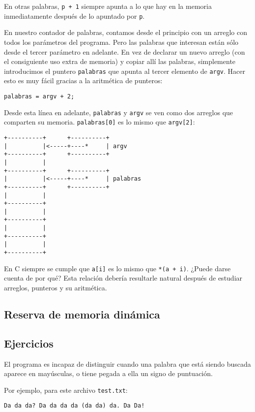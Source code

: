En otras palabras, \lstinline!p + 1! siempre apunta a lo que hay en la
memoria inmediatamente después de lo apuntado por \lstinline!p!.

En nuestro contador de palabras, contamos desde el principio con un
arreglo con todos los parámetros del programa. Pero las palabras que
interesan están sólo desde el tercer parámetro en adelante. En vez de
declarar un nuevo arreglo (con el consiguiente uso extra de memoria) y
copiar allí las palabras, simplemente introducimos el puntero
\lstinline!palabras! que apunta al tercer elemento de \lstinline!argv!.
Hacer esto es muy fácil gracias a la aritmética de punteros:

\begin{lstlisting}
palabras = argv + 2;
\end{lstlisting}

Desde esta línea en adelante, \lstinline!palabras! y \lstinline!argv! se
ven como dos arreglos que comparten su memoria. \lstinline!palabras[0]!
es lo mismo que \lstinline!argv[2]!:

\begin{lstlisting}
+----------+      +----------+
|          |<-----+----*     | argv
+----------+      +----------+
|          |
+----------+      +----------+
|          |<-----+----*     | palabras
+----------+      +----------+
|          |
+----------+
|          |
+----------+
|          |
+----------+
|          |
+----------+
\end{lstlisting}

En C siempre se cumple que \lstinline!a[i]! es lo mismo que
\lstinline!*(a + i)!. ¿Puede darse cuenta de por qué? Esta relación
debería resultarle natural después de estudiar arreglos, punteros y su
aritmética.

\subsection{Reserva de memoria dinámica}

\subsection{Ejercicios}

El programa es incapaz de distinguir cuando una palabra que está siendo
buscada aparece en mayúsculas, o tiene pegada a ella un signo de
puntuación.

Por ejemplo, para este archivo \lstinline!test.txt!:

\begin{lstlisting}
Da da da? Da da da da (da da) da. Da Da!
\end{lstlisting}

